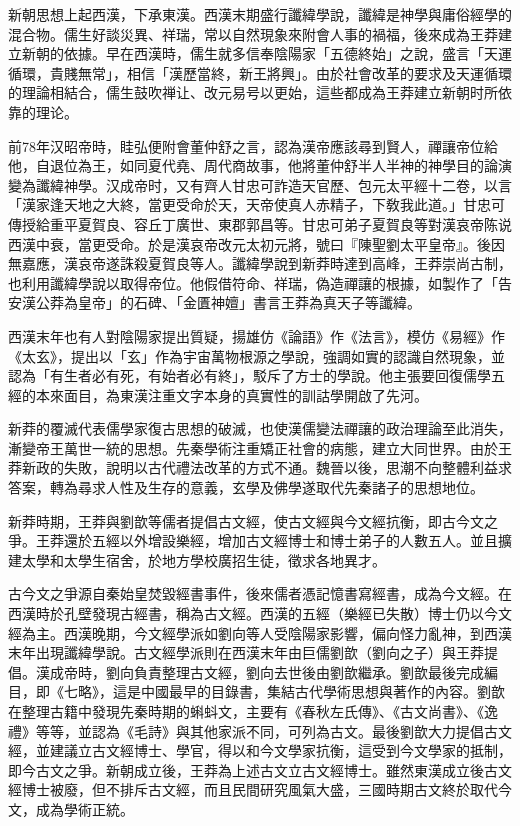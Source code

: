 新朝思想上起西漢，下承東漢。西漢末期盛行讖緯學說，讖緯是神學與庸俗經學的混合物。儒生好談災異、祥瑞，常以自然現象來附會人事的禍福，後來成為王莽建立新朝的依據。早在西漢時，儒生就多信奉陰陽家「五德終始」之說，盛言「天運循環，貴賤無常」，相信「漢歷當終，新王將興」。由於社會改革的要求及天運循環的理論相結合，儒生鼓吹禅让、改元易号以更始，這些都成為王莽建立新朝时所依靠的理论。

前78年汉昭帝時，眭弘便附會董仲舒之言，認為漢帝應該尋到賢人，禪讓帝位給他，自退位為王，如同夏代堯、周代商故事，他將董仲舒半人半神的神學目的論演變為讖緯神學。汉成帝时，又有齊人甘忠可詐造天官歷、包元太平經十二卷，以言「漢家逢天地之大終，當更受命於天，天帝使真人赤精子，下敎我此道。」甘忠可傳授給重平夏賀良、容丘丁廣世、東郡郭昌等。甘忠可弟子夏賀良等對漢哀帝陈说西漢中衰，當更受命。於是漢哀帝改元太初元將，號曰『陳聖劉太平皇帝』。後因無嘉應，漢哀帝遂誅殺夏賀良等人。讖緯學說到新莽時達到高峰，王莽崇尚古制，也利用讖緯學說以取得帝位。他假借符命、祥瑞，偽造禪讓的根據，如製作了「告安漢公莽為皇帝」的石碑、「金匱神嬗」書言王莽為真天子等讖緯。

西漢末年也有人對陰陽家提出質疑，揚雄仿《論語》作《法言》，模仿《易經》作《太玄》，提出以「玄」作為宇宙萬物根源之學說，強調如實的認識自然現象，並認為「有生者必有死，有始者必有終」，駁斥了方士的學說。他主張要回復儒學五經的本來面目，為東漢注重文字本身的真實性的訓詁學開啟了先河。

新莽的覆滅代表儒學家復古思想的破滅，也使漢儒變法禪讓的政治理論至此消失，漸變帝王萬世一統的思想。先秦學術注重矯正社會的病態，建立大同世界。由於王莽新政的失敗，說明以古代禮法改革的方式不通。魏晉以後，思潮不向整體利益求答案，轉為尋求人性及生存的意義，玄學及佛學遂取代先秦諸子的思想地位。

新莽時期，王莽與劉歆等儒者提倡古文經，使古文經與今文經抗衡，即古今文之爭。王莽還於五經以外增設樂經，增加古文經博士和博士弟子的人數五人。並且擴建太學和太學生宿舍，於地方學校廣招生徒，徵求各地異才。

古今文之爭源自秦始皇焚毀經書事件，後來儒者憑記憶書寫經書，成為今文經。在西漢時於孔壁發現古經書，稱為古文經。西漢的五經（樂經已失散）博士仍以今文經為主。西漢晚期，今文經學派如劉向等人受陰陽家影響，偏向怪力亂神，到西漢末年出現讖緯學說。古文經學派則在西漢末年由巨儒劉歆（劉向之子）與王莽提倡。漢成帝時，劉向負責整理古文經，劉向去世後由劉歆繼承。劉歆最後完成編目，即《七略》，這是中國最早的目錄書，集結古代學術思想與著作的內容。劉歆在整理古籍中發現先秦時期的蝌蚪文，主要有《春秋左氏傳》、《古文尚書》、《逸禮》等等，並認為《毛詩》與其他家派不同，可列為古文。最後劉歆大力提倡古文經，並建議立古文經博士、學官，得以和今文學家抗衡，這受到今文學家的抵制，即今古文之爭。新朝成立後，王莽為上述古文立古文經博士。雖然東漢成立後古文經博士被廢，但不排斥古文經，而且民間研究風氣大盛，三國時期古文終於取代今文，成為學術正統。

